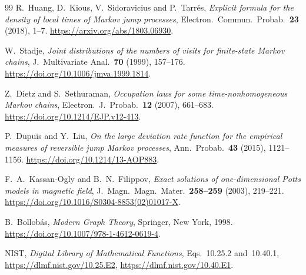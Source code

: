 \documentclass[11pt]{article}
\theoremstyle{definition}
\theoremstyle{remark}
\begin{document}
\begin{thebibliography}{99}
R.~Huang, D.~Kious, V.~Sidoravicius and P.~Tarr\'es, \emph{Explicit formula for
the density of local times of Markov jump processes},
Electron.~Commun.~Probab.~\textbf{23} (2018), 1--7.
\url{https://arxiv.org/abs/1803.06930}.

W.~Stadje, \emph{Joint distributions of the numbers of visits for finite-state
Markov chains}, J.~Multivariate Anal.~\textbf{70} (1999), 157--176.
\url{https://doi.org/10.1006/jmva.1999.1814}.

Z.~Dietz and S.~Sethuraman, \emph{Occupation laws for some
time-nonhomogeneous Markov chains}, Electron.~J.~Probab.~\textbf{12}
(2007), 661--683. \url{https://doi.org/10.1214/EJP.v12-413}.

P.~Dupuis and Y.~Liu, \emph{On the large deviation rate function for the
empirical measures of reversible jump Markov processes},
Ann.~Probab.~\textbf{43} (2015), 1121--1156.
\url{https://doi.org/10.1214/13-AOP883}.

F.~A.~Kassan-Ogly and B.~N.~Filippov, \emph{Exact solutions of one-dimensional
Potts models in magnetic field}, J.~Magn.~Magn.~Mater.~\textbf{258--259} (2003),
219--221. \url{https://doi.org/10.1016/S0304-8853(02)01017-X}.

B.~Bollob\'as, \emph{Modern Graph Theory}, Springer, New York, 1998.
\url{https://doi.org/10.1007/978-1-4612-0619-4}.

NIST, \emph{Digital Library of Mathematical Functions},
Eqs.~10.25.2 and~10.40.1,
\url{https://dlmf.nist.gov/10.25.E2},
\url{https://dlmf.nist.gov/10.40.E1}.
\end{thebibliography}
\end{document}
